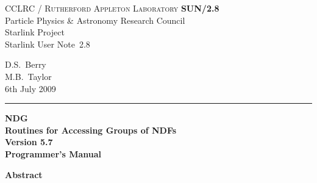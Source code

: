 \documentclass[twoside,11pt]{article}
\newcommand{\stardoccategory}  {Starlink User Note}
\newcommand{\stardocinitials}  {SUN}
\newcommand{\stardocnumber}    {2.8}
\newcommand{\stardocauthors}   {D.S.\ Berry \\ M.B.\ Taylor}
\newcommand{\stardocdate}      {6th July 2009}
\newcommand{\stardoctitle}     {NDG \\ [\latex{1ex}]
                                Routines for Accessing Groups of NDFs}
\newcommand{\stardocversion}   {Version 5.7}
\newcommand{\stardocmanual}    {Programmer's Manual}
\newcommand{\stardocname}{\stardocinitials /\stardocnumber}
\newenvironment{latexonly}{}{}
\newcommand{\latex}[1]{#1}
\renewcommand{\_}{\texttt{\symbol{95}}}
\begin{document}
\thispagestyle{empty}

\begin{latexonly}
   CCLRC / \textsc{Rutherford Appleton Laboratory} \hfill \textbf{\stardocname}\\
   {\large Particle Physics \& Astronomy Research Council}\\
   {\large Starlink Project\\}
   {\large \stardoccategory\ \stardocnumber}
   \begin{flushright}
   \stardocauthors\\
   \stardocdate
   \end{flushright}
   \vspace{-4mm}
   \rule{\textwidth}{0.5mm}
   \vspace{5mm}
   \begin{center}
   {\Huge\textbf{\stardoctitle \\ [2.5ex]}}
   {\LARGE\textbf{\stardocversion \\ [4ex]}}
   {\Huge\textbf{\stardocmanual}}
   \end{center}
   \vspace{5mm}


   \vspace{10mm}
   \begin{center}
      {\Large\textbf{Abstract}}
   \end{center}
\end{latexonly}
\end{document}
